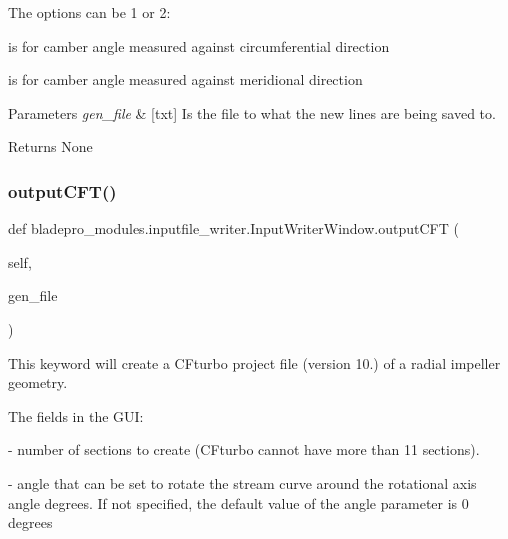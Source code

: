 The options can be 1 or 2\+:

\begin{DoxyItemize}
\item {} is for camber angle measured against circumferential direction \item {} is for camber angle measured against meridional direction\end{DoxyItemize}

\begin{DoxyParams}{Parameters}
{\em gen\+\_\+file} & \mbox{[}txt\mbox{]} Is the file to what the new lines are being saved to. \\
\hline
\end{DoxyParams}
\begin{DoxyReturn}{Returns}
None 
\end{DoxyReturn}
\hypertarget{a00070_ad727ca92f2959a8d915939c73f3dbff1}{}\label{a00070_ad727ca92f2959a8d915939c73f3dbff1} 
\subsubsection{\texorpdfstring{output\+C\+F\+T()}{outputCFT()}}
{\footnotesize\ttfamily def bladepro\+\_\+modules.\+inputfile\+\_\+writer.\+Input\+Writer\+Window.\+output\+C\+FT (\begin{DoxyParamCaption}\item[{}]{self,  }\item[{}]{gen\+\_\+file }\end{DoxyParamCaption})}



This keyword will create a C\+Fturbo project file (version 10.) of a radial impeller geometry. 

The fields in the G\+UI\+: \begin{DoxyItemize}
\item {} -\/ number of sections to create (C\+Fturbo cannot have more than 11 sections). \item {} -\/ angle that can be set to rotate the stream curve around the rotational axis angle degrees. If not specified, the default value of the angle parameter is 0 degrees\end{DoxyItemize}

